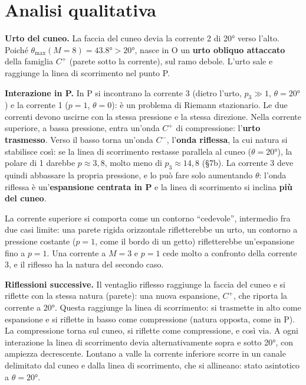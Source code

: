 \documentclass[11pt,a4paper]{article}
\newcommand{\Cp}{C^{+}}
\newcommand{\Cm}{C^{-}}
\begin{document}
\section{Analisi qualitativa}
\textbf{Urto del cuneo.} La faccia del cuneo devia la corrente 2 di \ang{20} verso l'alto. Poiché
$\theta_{\max}(M=8)=\ang{43.8}>\ang{20}$, nasce in O un \textbf{urto obliquo attaccato} della famiglia $\Cp$ (parete
sotto la corrente), sul ramo debole. L'urto sale e raggiunge la linea di scorrimento nel punto P.

\textbf{Interazione in P.} In P si incontrano la corrente 3 (dietro l'urto, $p_3\gg1$, $\theta=\ang{20}$) e la
corrente 1 ($p=1$, $\theta=0$): è un problema di Riemann stazionario. Le due correnti devono uscirne con la stessa
pressione e la stessa direzione. Nella corrente superiore, a bassa pressione, entra un'onda $\Cp$ di compressione:
l'\textbf{urto trasmesso}. Verso il basso torna un'onda $\Cm$, l'\textbf{onda riflessa}, la cui natura si stabilisce
così: se la linea di scorrimento restasse parallela al cuneo ($\theta=\ang{20}$), la polare di 1 darebbe
$p\approx3{,}8$, molto meno di $p_3\approx14{,}8$ (§7b). La corrente 3 deve quindi abbassare la propria pressione, e
lo può fare solo aumentando $\theta$: l'onda riflessa è un'\textbf{espansione centrata in P} e la linea di
scorrimento si inclina \textbf{più del cuneo}.

La corrente superiore si comporta come un contorno ``cedevole'', intermedio fra due casi limite: una parete rigida
orizzontale rifletterebbe un urto, un contorno a pressione costante ($p=1$, come il bordo di un getto) rifletterebbe
un'espansione fino a $p=1$. Una corrente a $M=3$ e $p=1$ cede molto a confronto della corrente 3, e il riflesso ha
la natura del secondo caso.

\textbf{Riflessioni successive.} Il ventaglio riflesso raggiunge la faccia del cuneo e si riflette con la stessa
natura (parete): una nuova espansione, $\Cp$, che riporta la corrente a \ang{20}. Questa raggiunge la linea di
scorrimento: si trasmette in alto come espansione e si riflette in basso come compressione (natura opposta, come
in P). La compressione torna sul cuneo, si riflette come compressione, e così via. A ogni interazione la linea di
scorrimento devia alternativamente sopra e sotto \ang{20}, con ampiezza decrescente. Lontano a valle la corrente
inferiore scorre in un canale delimitato dal cuneo e dalla linea di scorrimento, che si allineano: stato asintotico
a $\theta=\ang{20}$.
\end{document}

